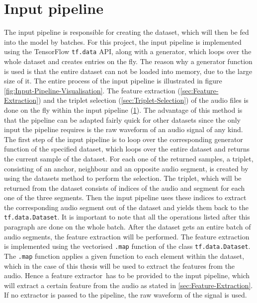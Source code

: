 \section{Input pipeline}
\label{sec:Input-Pipeline}
The input pipeline is responsible for creating the dataset, which will then be fed into the model by batches. For this project, the input pipeline is implemented using the TensorFlow \texttt{tf.data} API\footnotemark, along with a generator, which loops over the whole dataset and creates entries on the fly. The reason why a generator function is used is that the entire dataset can not be loaded into memory, due to the large size of it. The entire process of the input pipeline is illustrated in figure \ref{fig:Input-Pipeline-Visualisation}.
\newline
\newline
The feature extraction (\ref{sec:Feature-Extraction}) and the triplet selection (\ref{sec:Triplet-Selection}) of the audio files is done on the fly within the input pipeline (\ref{sec:Input-Pipeline}). The advantage of this method is that the pipeline can be adapted fairly quick for other datasets since the only input the pipeline requires is the raw waveform of an audio signal of any kind. 
\newline
\newline
The first step of the input pipeline is to loop over the corresponding generator function of the specified dataset, which loops over the entire dataset and returns the current sample of the dataset. For each one of the returned samples, a triplet, consisting of an anchor, neighbour and an opposite audio segment, is created by using the datasets method to perform the selection. The triplet, which will be returned from the dataset consists of indices of the audio and segment for each one of the three segments. Then the input pipeline uses these indices to extract the corresponding audio segment out of the dataset and yields them back to the \texttt{tf.data.Dataset}. It is important to note that all the operations listed after this paragraph are done on the whole batch.
\newline
\newline
After the dataset gets an entire batch of audio segments, the feature extraction will be performed. The feature extraction is implemented using the vectorised \texttt{.map} function of the class \texttt{tf.data.Dataset}\footnotemark. The \texttt{.map} function applies a given function to each element within the dataset, which in the case of this thesis will be used to extract the features from the audio. Hence a \flqq feature extractor\frqq \ has to be provided to the input pipeline, which will extract a certain feature from the audio as stated in \ref{sec:Feature-Extraction}. If no extractor is passed to the pipeline, the raw waveform of the signal is used. 
